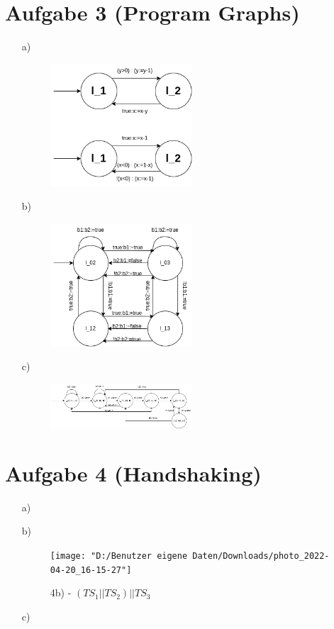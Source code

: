 \documentclass[a4paper,11pt]{scrartcl}
\begin{document}
	\section*{Aufgabe 3 (Program Graphs)}
	\begin{itemize}
		\item[a)] \begin{figure}[h]
			\centering
			\includegraphics[width=0.5\textwidth]{t3a}
			\caption{}
			\label{fig:t3a}
		\end{figure}
		\item[b)] \begin{figure}[h]
			\centering
			\includegraphics[width=0.5\textwidth]{t3b}
			\caption{}
			\label{fig:t3b}
		\end{figure}
		\item[c)] \begin{figure}[h]
			\centering
			\includegraphics[width=0.5\textwidth]{t3c}
			\caption{}
			\label{fig:t3c}
		\end{figure}
	\end{itemize}

		
	
	\section*{Aufgabe 4 (Handshaking)}
	
	\begin{itemize}
		\item[a)]
		\item[b)] 
		\begin{figure}
			\centering
			\texttt{[image: "D:/Benutzer eigene Daten/Downloads/photo\_2022-04-20\_16-15-27"]}
			\caption{ 4b) - $(TS_1 || TS_2) || TS_3$}
			\label{fig:4b - $(TS_1 || TS_2) || TS_3$}
		\end{figure}
		\item[c)]
	\end{itemize}
	
\end{document}
